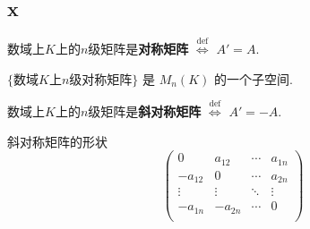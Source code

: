 \begin{Note}
\begin{comment}
\vdots \\
\gamma_j \\
\vdots \\
\gamma_i \\
\vdots \\
\gamma_s \\
\end{pmatrix} \\
A\;P(i,j) &= (\alpha_1, \cdots, \alpha_i, \cdots, \alpha_j, \cdots, \alpha_n)
\begin{pmatrix}
1 &        &   &        &   &        &   \\
  & \ddots &   &        &   &        &   \\
  &        & 0 &        & 1 &        &   \\
  &        &   & \ddots &   &        &   \\
  &        & 1 &        & 0 &        &   \\
  &        &   &        &   & \ddots &   \\
  &        &   &        &   &        & 1 \\
\end{pmatrix} \\
&= (\alpha_1, \cdots, \alpha_i + k \alpha_j, \cdots, \alpha_i, \cdots, \alpha_n)  \\
\end{aligned} 
]\]
\end{comment}
\end{Note}

\subsection{x}

\begin{Definition}[对称矩阵]
数域上$K$上的$n$级矩阵是\textbf{对称矩阵} $\stackrel{\text{def}}{\iff}$ $A' = A$.
\end{Definition}

\begin{Note}
$\{$数域$K$上$n$级对称矩阵$\}$ 是 $M_n(K)$ 的一个子空间.
\end{Note}

\begin{Definition}[斜对称矩阵]
数域上$K$上的$n$级矩阵是\textbf{斜对称矩阵} $\stackrel{\text{def}}{\iff}$ $A' = -A$.
\end{Definition}

\begin{Note}
斜对称矩阵的形状
\[
\begin{pmatrix}
0       & a_{12}   & \cdots & a_{1n} \\
-a_{12} & 0        & \cdots & a_{2n} \\
\vdots  & \vdots   & \ddots & \vdots \\
-a_{1n} & -a_{2n}  & \cdots & 0      \\
\end{pmatrix}
\]
\end{Note}

